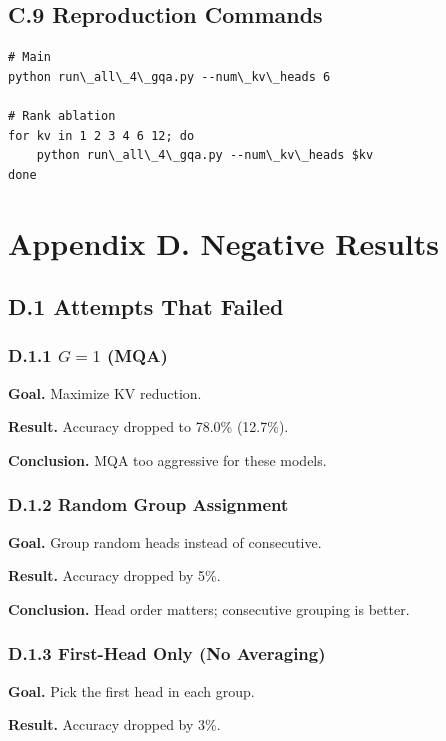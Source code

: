 \subsection{C.9 Reproduction Commands}

\begin{lstlisting}
# Main
python run\_all\_4\_gqa.py --num\_kv\_heads 6

# Rank ablation
for kv in 1 2 3 4 6 12; do
    python run\_all\_4\_gqa.py --num\_kv\_heads $kv
done
\end{lstlisting}


\section{Appendix D. Negative Results}

\subsection{D.1 Attempts That Failed}

\subsubsection{D.1.1 $G = 1$ (MQA)}

\textbf{Goal.} Maximize KV reduction.

\textbf{Result.} Accuracy dropped to 78.0\% (12.7\%).

\textbf{Conclusion.} MQA too aggressive for these models.

\subsubsection{D.1.2 Random Group Assignment}

\textbf{Goal.} Group random heads instead of consecutive.

\textbf{Result.} Accuracy dropped by 5\%.

\textbf{Conclusion.} Head order matters; consecutive grouping is better.

\subsubsection{D.1.3 First-Head Only (No Averaging)}

\textbf{Goal.} Pick the first head in each group.

\textbf{Result.} Accuracy dropped by 3\%.

